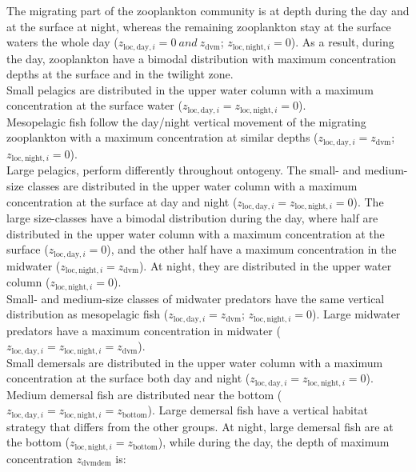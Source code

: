 \documentclass[
]{article}
\begin{document}
The migrating part of the zooplankton community is at depth during the
day and at the surface at night, whereas the remaining zooplankton stay
at the surface waters the whole day
(\(z_{\mathrm{loc},\mathrm{day},i} = 0~and~z_{\mathrm{dvm}}\);
\(z_{\mathrm{loc},\mathrm{night},i} = 0\)). As a result, during the day,
zooplankton have a bimodal distribution with maximum concentration
depths at the surface and in the twilight zone.\\
Small pelagics are distributed in the upper water column with a maximum
concentration at the surface water
(\(z_{\mathrm{loc},\mathrm{day},i} = z_{\mathrm{loc},\mathrm{night},i} = 0\)).\\
Mesopelagic fish follow the day/night vertical movement of the migrating
zooplankton with a maximum concentration at similar depths
(\(z_{\mathrm{loc},\mathrm{day},i} = z_{\mathrm{dvm}}\);
\(z_{\mathrm{loc},\mathrm{night},i} = 0\)).\\
Large pelagics, perform differently throughout ontogeny. The small- and
medium-size classes are distributed in the upper water column with a
maximum concentration at the surface at day and night
(\(z_{\mathrm{loc},\mathrm{day},i} = z_{\mathrm{loc},\mathrm{night},i} = 0\)).
The large size-classes have a bimodal distribution during the day, where
half are distributed in the upper water column with a maximum
concentration at the surface (\(z_{\mathrm{loc},\mathrm{day},i} = 0\)),
and the other half have a maximum concentration in the midwater
(\(z_{\mathrm{loc},\mathrm{night},i} = z_{\mathrm{dvm}}\)). At night,
they are distributed in the upper water column
(\(z_{\mathrm{loc},\mathrm{night},i} = 0\)).\\
Small- and medium-size classes of midwater predators have the same
vertical distribution as mesopelagic fish
(\(z_{\mathrm{loc},\mathrm{day},i} = z_{\mathrm{dvm}}\);
\(z_{\mathrm{loc},\mathrm{night},i} = 0\)). Large midwater predators
have a maximum concentration in midwater
(\(z_{\mathrm{loc},\mathrm{day},i} = z_{\mathrm{loc},\mathrm{night},i} = z_{\mathrm{dvm}}\)).\\
Small demersals are distributed in the upper water column with a maximum
concentration at the surface both day and night
(\(z_{\mathrm{loc},\mathrm{day},i} = z_{\mathrm{loc},\mathrm{night},i} = 0\)).
Medium demersal fish are distributed near the bottom
(\(z_{\mathrm{loc},\mathrm{day},i} = z_{\mathrm{loc},\mathrm{night},i} = z_{\mathrm{bottom}}\)).
Large demersal fish have a vertical habitat strategy that differs from
the other groups. At night, large demersal fish are at the bottom
(\(z_{\mathrm{loc},\mathrm{night},i} = z_{\mathrm{bottom}}\)), while
during the day, the depth of maximum concentration
\(z_{\mathrm{dvmdem}}\) is:
\end{document}
